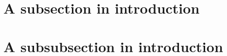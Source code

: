\documentclass[../main.tex]{subfiles}
\begin{document}
\section{A subsection in introduction}
        \lipsum[2]

\section{A subsubsection in introduction}
        \lipsum[3]
\end{document}
